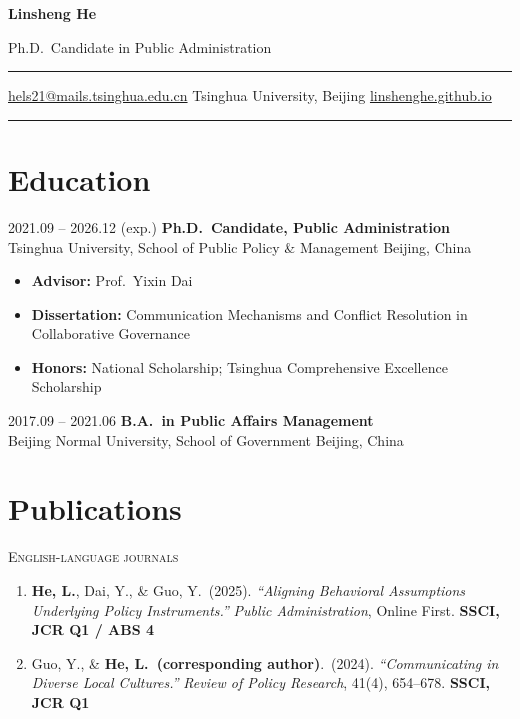 \documentclass[10pt, a4paper]{article}
\makeatletter
\newcommand{\makeplasmatiheader}{
  \begin{center}
    {\fontsize{28pt}{34pt}\selectfont\bfseries Linsheng He}

    \vspace{6pt}

    {\color{soft}\large Ph.D.\ Candidate in Public Administration}

    \vspace{6pt}

    {\color{accent}\rule{0.4\textwidth}{0.8pt}}

    \vspace{8pt}

    {\small
      \faEnvelope\enspace\href{mailto:hels21@mails.tsinghua.edu.cn}{hels21@mails.tsinghua.edu.cn}
      \hspace{2em}
      \faMapMarker*\enspace Tsinghua University, Beijing
      \hspace{2em}
      \faGlobe\enspace\href{https://linshenghe.github.io}{linshenghe.github.io}
    }

    \vspace{4pt}
    {\color{accent}\rule{0.4\textwidth}{0.3pt}}
  \end{center}
  \vspace{8pt}
}
\newcommand{\entry}[4]{
  {\color{soft}\small #1} \hfill
  \textbf{#2} \\
  #3 \hfill {\color{soft}\small #4}
}
\makeatother
\begin{document}
\makeplasmatiheader

\section{Education}

\entry{2021.09 -- 2026.12 (exp.)}
  {Ph.D.\ Candidate, Public Administration}
  {Tsinghua University, School of Public Policy \& Management}
  {Beijing, China}

\vspace{4pt}
\begin{itemize}[leftmargin=2em]
  \item \textbf{Advisor:} Prof.\ Yixin Dai
  \item \textbf{Dissertation:} Communication Mechanisms and Conflict Resolution in Collaborative Governance
  \item \textbf{Honors:} National Scholarship; Tsinghua Comprehensive Excellence Scholarship
\end{itemize}

\vspace{8pt}

\entry{2017.09 -- 2021.06}
  {B.A.\ in Public Affairs Management}
  {Beijing Normal University, School of Government}
  {Beijing, China}

\section{Publications}

\vspace{2pt}
{\color{accent}\scshape English-language journals}
\vspace{4pt}

\begin{enumerate}[leftmargin=2em, itemsep=6pt]
  \item \textbf{He, L.}, Dai, Y., \& Guo, Y.\ (2025).
    \textit{``Aligning Behavioral Assumptions Underlying Policy Instruments.''}
    \textit{Public Administration}, Online First.
    \hfill {\color{soft}\textbf{SSCI, JCR Q1 / ABS 4}}

  \item Guo, Y., \& \textbf{He, L.\ (corresponding author)}.\ (2024).
    \textit{``Communicating in Diverse Local Cultures.''}
    \textit{Review of Policy Research}, 41(4), 654--678.
    \hfill {\color{soft}\textbf{SSCI, JCR Q1}}
\end{enumerate}
\end{document}
